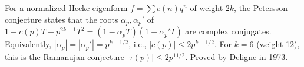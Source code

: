 For a normalized Hecke eigenform $f = \sum c(n)q^n$ of weight $2k$, the Petersson conjecture states that the roots $\alpha_p, \alpha_p'$ of $1 - c(p)T + p^{2k-1}T^2 = (1-\alpha_p T)(1-\alpha_p' T)$ are complex conjugates. Equivalently, $|\alpha_p| = |\alpha_p'| = p^{k-1/2}$, i.e., $|c(p)| \leq 2p^{k-1/2}$. For $k=6$ (weight 12), this is the Ramanujan conjecture $|\tau(p)| \leq 2p^{11/2}$. Proved by Deligne in 1973.
